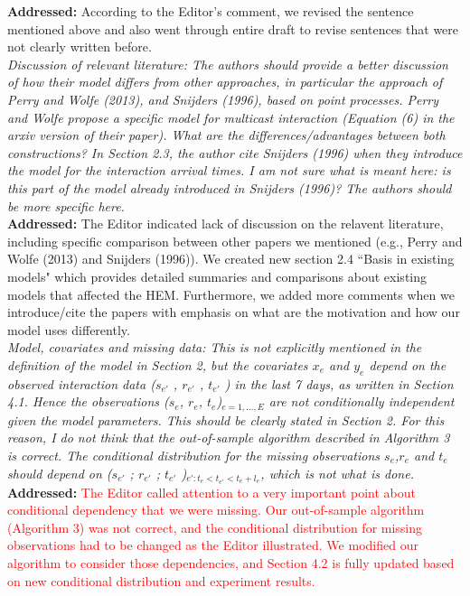 \documentclass[12pt]{article}
\newcommand{\grey}[1]{{\color{mygrey}#1}}
\theoremstyle{definition}
\begin{document}
\noindent \textcolor{MyGreen}{\textbf{Addressed:}} According to the Editor's comment, we revised the sentence mentioned above and also went through entire draft to revise sentences that were not clearly written before. \\


 \grey{\emph{ Discussion of relevant literature: The authors should provide a better discussion of how their model differs from other approaches, in particular the approach of Perry and Wolfe (2013), and Snijders (1996), based on point processes. Perry and Wolfe propose a specific model for multicast interaction (Equation (6) in the arxiv version of their paper). What are the differences/advantages between both constructions? In Section 2.3, the author cite Snijders (1996) when they introduce the model for the interaction arrival times. I am not sure what is meant here: is this part of the model already introduced in Snijders (1996)? The authors should be more specific here.}}\\

\noindent \textcolor{MyGreen}{\textbf{Addressed:}} The Editor indicated lack of discussion on the relavent literature, including specific comparison between other papers we mentioned (e.g., Perry and Wolfe (2013) and Snijders (1996)). We created new section 2.4 ``Basis in existing models" which provides detailed summaries and comparisons about existing models that affected the HEM. Furthermore, we added more comments when we introduce/cite the papers with emphasis on what are the motivation and how our model uses differently.\\

 \grey{\emph{ Model, covariates and missing data: This is not explicitly mentioned in the definition of the model in Section 2, but the covariates $x_e$ and $y_e$ depend on the observed interaction data ($s_{e'}$ , $r_{e'}$ , $t_{e'}$ ) in the last 7 days, as written in Section 4.1. Hence the observations ($s_e$, $r_e$, $t_e$)$_{e=1,...,E}$ are not conditionally independent given the model parameters. This should be clearly stated in Section 2. For this reason, I do not think that the out-of-sample algorithm described in Algorithm 3 is correct. The conditional distribution for the missing observations $s_e$,$r_e$ and $t_e$ should depend on ($s_{e'}$ ; $r_{e'}$ ; $t_{e'}$ )$_{e': t_e < t_{e'} < t_{e} + l_e }$, which is not what is done. }}\\

\noindent \textcolor{MyGreen}{\textbf{Addressed:}} \textcolor{red}{The Editor called attention to a very important point about conditional dependency that we were missing. Our out-of-sample algorithm (Algorithm 3) was not correct, and the conditional distribution for missing observations had to be changed as the Editor illustrated. We modified our algorithm to consider those dependencies, and Section 4.2 is fully updated based on new conditional distribution and experiment results. }\\
\end{document}
